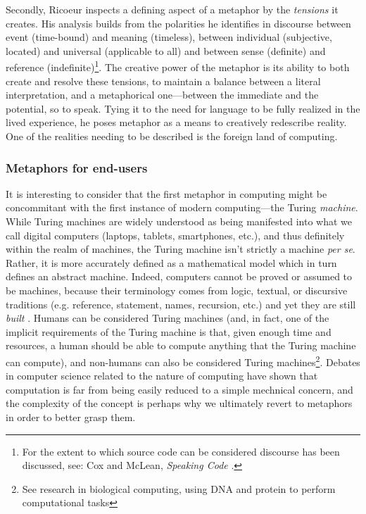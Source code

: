 Secondly, Ricoeur inspects a defining aspect of a metaphor by the \emph{tensions} it creates. His analysis builds from the polarities he identifies in discourse between event (time-bound) and meaning (timeless), between individual (subjective, located) and universal (applicable to all) and between sense (definite) and reference (indefinite)\footnote{For the extent to which source code can be considered discourse has been discussed, see: Cox and McLean, \emph{Speaking Code} \citep{cox_speaking_2013}.}. The creative power of the metaphor is its ability to both create and resolve these tensions, to maintain a balance between a literal interpretation, and a metaphorical one—between the immediate and the potential, so to speak. Tying it to the need for language to be fully realized in the lived experience, he poses metaphor as a means to creatively redescribe reality. One of the realities needing to be described is the foreign land of computing.


\subsubsection{Metaphors for end-users}
\label{subsubsec:metaphors-users}

It is interesting to consider that the first metaphor in computing might be concommitant with the first instance of modern computing—the Turing \emph{machine}. While Turing machines are widely understood as being manifested into what we call digital computers (laptops, tablets, smartphones, etc.), and thus definitely within the realm of machines, the Turing machine isn't strictly a machine \emph{per se}. Rather, it is more accurately defined as a mathematical model which in turn defines an abstract machine. Indeed, computers cannot be proved or assumed to be machines, because their terminology comes from logic, textual, or discursive traditions (e.g. reference, statement, names, recursion, etc.) and yet they are still \emph{built} \citep{smith_origin_1998}. Humans can be considered Turing machines (and, in fact, one of the implicit requirements of the Turing machine is that, given enough time and resources, a human should be able to compute anything that the Turing machine can compute), and non-humans can also be considered Turing machines\footnote{See research in biological computing, using DNA and protein to perform computational tasks}. Debates in computer science related to the nature of computing \citep{rapaport_philosophy_2005} have shown that computation is far from being easily reduced to a simple mechnical concern, and the complexity of the concept is perhaps why we ultimately revert to metaphors in order to better grasp them.

